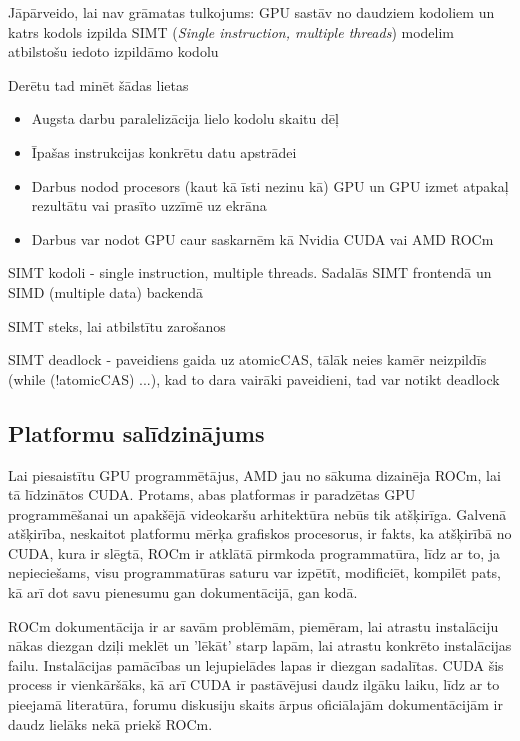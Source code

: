 \documentclass[12pt]{report}%
\theoremstyle{definition}
\begin{document}
Jāpārveido, lai nav grāmatas tulkojums:    GPU sastāv no daudziem kodoliem un katrs kodols izpilda
SIMT (\textit{Single instruction, multiple threads}) modelim atbilstošu iedoto izpildāmo kodolu




Derētu tad minēt šādas lietas
\begin{itemize}
   \item Augsta darbu paralelizācija lielo kodolu skaitu dēļ
   \item Īpašas instrukcijas konkrētu datu apstrādei
   \item Darbus nodod procesors (kaut kā īsti nezinu kā) GPU un GPU izmet atpakaļ rezultātu vai prasīto uzzīmē uz ekrāna
   \item Darbus var nodot GPU caur saskarnēm kā Nvidia CUDA vai AMD ROCm
\end{itemize}

SIMT kodoli - single instruction, multiple threads. Sadalās SIMT frontendā un SIMD (multiple data) backendā

SIMT steks, lai atbilstītu zarošanos

SIMT deadlock - paveidiens gaida uz atomicCAS, tālāk neies kamēr neizpildīs (while (!atomicCAS) ...), kad to dara vairāki paveidieni, tad var notikt deadlock

\begin{center}
\chapter{Platformu salīdzinājums}
\end{center}
Lai piesaistītu GPU programmētājus, AMD jau no sākuma dizainēja ROCm, lai tā līdzinātos CUDA. Protams,
abas platformas ir paradzētas GPU programmēšanai un apakšējā videokaršu arhitektūra nebūs tik atšķirīga.
Galvenā atšķirība, neskaitot platformu mērķa grafiskos procesorus, ir fakts, ka atšķirībā no CUDA, kura
ir slēgtā, ROCm ir atklātā pirmkoda programmatūra, līdz ar to, ja nepieciešams, visu programmatūras saturu 
var izpētīt, modificiēt, kompilēt pats, kā arī dot savu pienesumu gan dokumentācijā, gan kodā.\cite{what_is_ROCM}

ROCm dokumentācija ir ar savām problēmām, piemēram, lai atrastu instalāciju nākas diezgan dziļi meklēt
un 'lēkāt' starp lapām, lai atrastu konkrēto instalācijas failu. Instalācijas pamācības un lejupielādes
lapas ir diezgan sadalītas. CUDA šis process ir vienkāršāks, kā arī CUDA ir pastāvējusi daudz ilgāku
laiku, līdz ar to pieejamā literatūra, forumu diskusiju skaits ārpus oficiālajām dokumentācijām ir daudz 
lielāks nekā priekš ROCm.
\end{document}
